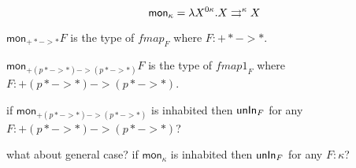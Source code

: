\[
\textsf{mon}_\kappa
  = \lambda X^{0\kappa}.X \rightrightarrows^\kappa X
\]

$\textsf{mon}_{+* -> *} F$ is the type of $\textit{fmap}_F$
where $F : +* -> *$.

$\textsf{mon}_{+(p* -> *)->(p* -> *)} F$ is the type of $\textit{fmap1}_F$
where $F : +(p* -> *)->(p* -> *)$.

if $\textsf{mon}_{+(p* -> *)->(p* -> *)}$ is inhabited
then $\mathsf{unIn}_F$ for any $F : +(p* -> *)->(p* -> *)$?

what about general case? if $\textsf{mon}_\kappa$ is inhabited
then $\mathsf{unIn}_F$ for any $F : \kappa$?

